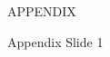 \begin{frame}
    \frametitle{}
    \centering
    \Huge
    APPENDIX
\end{frame}


\begin{frame}{Appendix Slide 1}
    
    \label{app-slide-1}



\end{frame}
